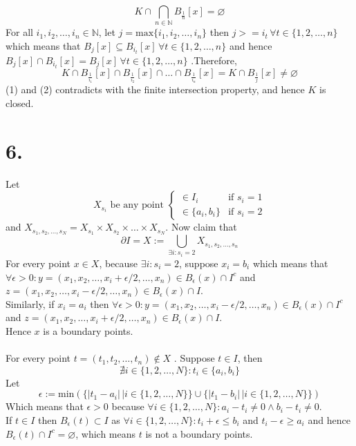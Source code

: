 \documentclass[11pt]{article}
\begin{document}
\begin{equation}
K \cap \bigcap_{n \in \mathbb{N}} B_{\frac{1}{n}}[x] = \varnothing
\end{equation}
For all $i_1, i_2, \ldots , i_n \in \mathbb{N}$, let $j = \text{max}\{i_1, i_2, \ldots ,i_n\}$ then $j>=i_t \, \forall t \in \{1,2,\ldots,n\}$ which means that $B_j [x] \subseteq B_{i_t}[x] \, \forall t \in \{1,2,\ldots,n\}$ and hence $B_j [x] \cap B_{i_t}[x] = B_j[x] \, \forall t \in \{1,2,\ldots,n\}$
.Therefore,
\begin{equation}
K \cap B_{\frac{1}{i_1}} [x] \cap B_{\frac{1}{i_2}} [x] \cap \ldots \cap B_{\frac{1}{i_n}} [x] = K \cap B_{\frac{1}{j}} [x] \ne \varnothing
\end{equation}
(1) and (2) contradicts with the finite intersection property, and hence $K$ is closed.
\pagebreak
\section*{6.}
Let 
\[
X_{s_i} \text{ be any point }
\begin{cases}
\in I_i &\text {if } s_i = 1 \\
\in \{a_i, b_i\} &\text {if } s_i = 2 
\end{cases}
\]
and $X_{s_1, s_2, \ldots, s_N} = X_{s_1} \times X_{s_2} \times \ldots \times X_{s_N}$.
Now claim that
\[
\partial I = X:= \bigcup\limits_{\exists i: s_i = 2} X_{s_1, s_2, \ldots, s_n} 
\]
For every point $x \in X$, because $\exists i:s_i = 2$, suppose $x_i = b_i$ which means that $\forall \epsilon >0: y = (x_1, x_2, \ldots, x_i + \epsilon/2, \ldots, x_n) \in B_\epsilon(x) \cap I^c$ and $z = (x_1, x_2, \ldots, x_i - \epsilon/2, \ldots, x_n) \in B_\epsilon(x) \cap I$. \\
Similarly, if $x_i = a_i$ then $\forall \epsilon >0: y = (x_1, x_2, \ldots, x_i - \epsilon/2, \ldots, x_n) \in B_\epsilon(x) \cap I^c$ and $z = (x_1, x_2, \ldots, x_i + \epsilon/2, \ldots, x_n) \in B_\epsilon(x) \cap I$.\\
Hence $x$ is a boundary points.\\~\\
For every point $t= (t_1, t_2, \ldots, t_n) \notin X$ . 
Suppose $t \in I$, then 
\[
\nexists i \in \{1,2,\ldots, N\}:t_i \in \{a_i, b_i\} 
\]
Let
\[
\epsilon:= \text{min} (\{ |t_1 - a_i| \, | i \in \{1,2,\ldots,N\}\} \cup \{|t_1 - b_i| \, | i \in \{1,2,\ldots,N\}\})
\]
Which means that $\epsilon >0$ because $\forall i \in \{1,2,\ldots,N\}: a_i - t_i \ne 0 \land b_i - t_i \ne 0$. \\
If $t \in I$ then $B_\epsilon(t) \subset I$ as $\forall i \in \{1,2,\ldots,N\}: t_i + \epsilon \le b_i$ and $t_i -\epsilon \ge a_i$ and hence $B_\epsilon(t) \cap I^c = \varnothing$, which means $t$ is not a boundary points.
\end{document}
